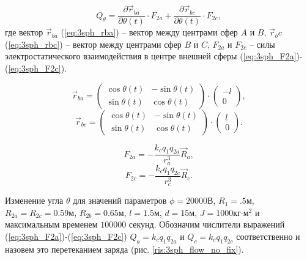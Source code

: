 \begin{equation}
\label{eq:3sph_Qj}
	Q_\theta = \frac{\partial \vec{r}_{ba}}{\partial \theta(t)} \cdot F_{2a} + \frac{\partial \vec{r}_{bc}}{\partial \theta(t)} \cdot F_{2c},
\end{equation}
где вектор $\vec{r}_{ba}$ (\ref{eq:3sph_rba}) – вектор между центрами сфер $A$ и $B$, $\vec{r}_bc$ (\ref{eq:3sph_rbc}) – вектор между центрами сфер $B$ и $C$, $F_{2a}$ и $F_{2c}$ – силы электростатического взаимодействия в центре внешней сферы (\ref{eq:3sph_F2a})-(\ref{eq:3sph_F2c}).

\begin{equation}
\label{eq:3sph_rba}
	\vec{r}_{ba} = 
	\begin{pmatrix}
		\cos \theta(t)	& 	-\sin \theta(t)\\
		\sin \theta(t)	&	\cos \theta(t)
	\end{pmatrix}
	\cdot
	\begin{pmatrix}
		-l \\
		0
	\end{pmatrix},
\end{equation}
\begin{equation}
\label{eq:3sph_rbc}
	\vec{r}_{bc} = 
	\begin{pmatrix}
		\cos \theta(t)	& 	-\sin \theta(t)\\
		\sin \theta(t)	&	\cos \theta(t)
	\end{pmatrix}
	\cdot
	\begin{pmatrix}
		l \\
		0
	\end{pmatrix}.
\end{equation}

\begin{equation}
\label{eq:3sph_F2a}
	F_{2a} = - \frac{k_c q_1 q_{2a}}{r_a^3} \vec{R}_a,
\end{equation}
\begin{equation}
\label{eq:3sph_F2c}
	F_{2c} = - \frac{k_c q_1 q_{2c}}{r_c^3} \vec{R}_c.
\end{equation}

Изменение угла $\theta$ для значений параметров $\phi = 20000$В, $R_1 = .5$м, $R_{2a} = R_{2c} = 0.59$м, $R_{2b} = 0.65$м, $l = 1.5$м, $d = 15$м, $J = 1000$кг$\cdot$м${}^2$ \cite{3sph} и максимальным временем $100000$ секунд.
Обозначим числители выражений (\ref{eq:3sph_F2a})-(\ref{eq:3sph_F2c}) $Q_a = k_c q_1 q_{2a}$ и $Q_c = k_c q_1 q_{2c}$ соответственно и назовем это перетеканием заряда (рис. \ref{ris:3sph_flow_no_fix}).

